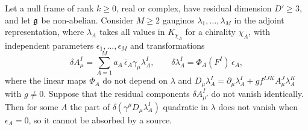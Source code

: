 \begin{proposition}
\label{prop:several}
Let a null frame of rank $k\ge0$, real or complex, have residual dimension $D'\ge3$, and let $\mathfrak{g}$ be non-abelian. Consider $M\ge2$ gauginos $\lambda_1,\dots,\lambda_M$ in the adjoint representation, where $\lambda_A$ takes all values in $K_{\chi_A}$ for a chirality $\chi_A$, with independent parameters $\epsilon_1,\dots,\epsilon_M$ and transformations
\begin{equation}
\label{eq:several}
\delta A^I_\mu=\sum_{A=1}^M a_A\,\bar\epsilon_A\gamma_\mu\lambda^I_A,\qquad \delta\lambda^I_A=\Phi_A(F^I)\,\epsilon_A ,
\end{equation}
where the linear maps $\Phi_A$ do not depend on $\lambda$ and $D_\mu\lambda^I_A=\partial_\mu\lambda^I_A+gf^{IJK}A^J_\mu\lambda^K_A$ with $g\ne0$. Suppose that the residual components $\delta A^I_{\mu'}$ do not vanish identically. Then for some $A$ the part of $\delta(\gamma^\mu D_\mu\lambda^I_A)$ quadratic in $\lambda$ does not vanish when $\epsilon_A=0$, so it cannot be absorbed by a source.
\end{proposition}

